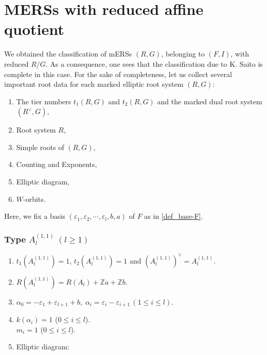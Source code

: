 \documentclass[11pt]{amsart}
\newcommand{\Z}{\mathbb{Z}}
\newcommand{\vep}{\varepsilon}
\begin{document}
{%


\section{MERSs with reduced affine quotient}\label{sect_clasfficiation-red-quot}
We obtained the classification of mERSs $(R,G)$, belonging to $(F,I)$, with reduced $R/G$. As a consequence, one sees that the classification due to K. Saito \cite{Saito1985} is complete in this case. For the sake of completeness, let us collect several important root data for each marked elliptic root system $(R,G)$:
\begin{enumerate}
\item The tier numbers $t_1(R,G)$ and $t_2(R,G)$ and the marked dual root system $(R^\vee,G)$,
\item Root system $R$,
\item Simple roots of $(R,G)$,
\item Counting and Exponents,
\item Elliptic diagram,
\item $W$-orbits.
\end{enumerate}
Here, we fix a basis $(\vep_1, \vep_2,\cdots,\vep_l,b,a)$ of $F$ as in \eqref{def_base-F}. 
\setcounter{subsection}{1}

\subsubsection{Type $A_l^{(1,1)}\; (l\geq 1)$}
\begin{enumerate}
\item $t_1(A_l^{(1,1)})=1$, \;  $t_2(A_l^{(1,1)})=1$ and 
$(A_l^{(1,1)})^\vee=A_l^{(1,1)}$.
\item $R(A_l^{(1,1)})=R(A_l)+\Z a+\Z b$.
\item $\alpha_0=-\vep_1+\vep_{l+1}+b, \; \alpha_i=\vep_i-\vep_{i+1}\, (1\leq i\leq l)$.
\item $k(\alpha_i)=1$ \quad ($0\leq i\leq l$). \\
         $m_i=1$ \quad ($0\leq i\leq l$).
\item Elliptic diagram:
\begin{center}
\end{center}
\end{enumerate}}
\end{document}
